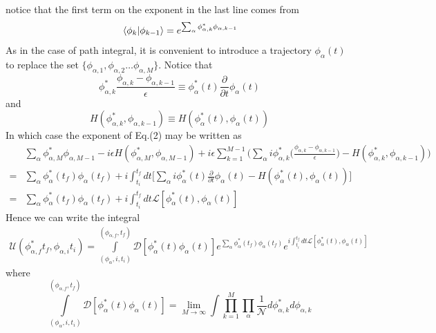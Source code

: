 \documentclass[12pt]{article}
\begin{document}
 notice that the first term on the exponent in the last line comes from 
 \begin{equation*}
     \braket*{\phi_k}{\phi_{k-1}}=e^{\sum_\alpha\phi^*_{\alpha,k}\phi_{\alpha,k-1}}
 \end{equation*}
 As in the case of path integral, it is convenient to introduce a trajectory 
 $\phi_\alpha(t)$ to replace the set $\{\phi_{\alpha,1},\phi_{\alpha,2}\dots\phi_{\alpha,M}\}$. 
 Notice that 
 \begin{equation*}
    \phi^*_{\alpha,k}\frac{\phi_{\alpha,k}-\phi_{\alpha,k-1}}{\epsilon}\equiv
    \phi^*_\alpha(t)\frac{\partial}{\partial t}\phi_\alpha(t)
 \end{equation*}
 and
 \begin{equation*}
     H(\phi^*_{\alpha,k},\phi_{\alpha,k-1})\equiv H(\phi^*_\alpha(t),\phi_\alpha(t))
 \end{equation*}
 In which case the exponent of Eq.(2) may be written as 
 \begin{equation*}
     \begin{split}
        &\sum_\alpha\phi^*_{\alpha,M}\phi_{\alpha,M-1}-i\epsilon H(\phi^*_{\alpha,M},
        \phi_{\alpha,M-1})+i\epsilon\sum_{k=1}^{M-1}\bigg(\sum_\alpha i\phi^*_{\alpha,k}
        \Big(\frac{\phi_{\alpha,k}-\phi_{\alpha,k-1}}{\epsilon}\Big)-H(\phi^*_{\alpha,k},
        \phi_{\alpha,k-1})\bigg)\\
        =&\sum_\alpha\phi^*_\alpha(t_f)\phi_\alpha(t_f)
        +i\int_{t_i}^{t_f}dt\bigg[\sum_\alpha i\phi^*_\alpha(t)
        \frac{\partial}{\partial t}\phi_\alpha(t)-H(\phi^*_\alpha(t),\phi_\alpha(t))\bigg]\\
        =&\sum_\alpha\phi^*_\alpha(t_f)\phi_\alpha(t_f)
        +i\int_{t_i}^{t_f}dt\mathcal{L}[\phi^*_\alpha(t),\phi_\alpha(t)]
     \end{split}
 \end{equation*}
Hence we can write the integral 
\begin{equation*}
    \begin{split}
            \mathcal{U}(\phi^*_{\alpha,f}t_f,\phi_{\alpha,i}t_i)=\int\limits
        _{(\phi_\alpha,i,t_i)}^{(\phi_{\alpha,f},t_f)}\mathcal{D}[\phi^*_\alpha(t)
        \phi_\alpha(t)]e^{\sum_\alpha\phi^*_\alpha(t_f)\phi_\alpha(t_f)}
        e^{i\int_{t_i}^{t_f}dt\mathcal{L}[\phi^*_\alpha(t),\phi_\alpha(t)]}
    \end{split}
\end{equation*}
where
\begin{equation*}
    \int\limits_{(\phi_\alpha,i,t_i)}^{(\phi_{\alpha,f},t_f)}\mathcal{D}
    [\phi_\alpha^*(t)\phi_\alpha(t)]=\lim_{M\rightarrow\infty}\int\prod_{k=1}^M
    \prod_\alpha\frac{1}{\mathcal{N}}d\phi^*_{\alpha,k}d\phi_{\alpha,k}
\end{equation*}
\end{document}
